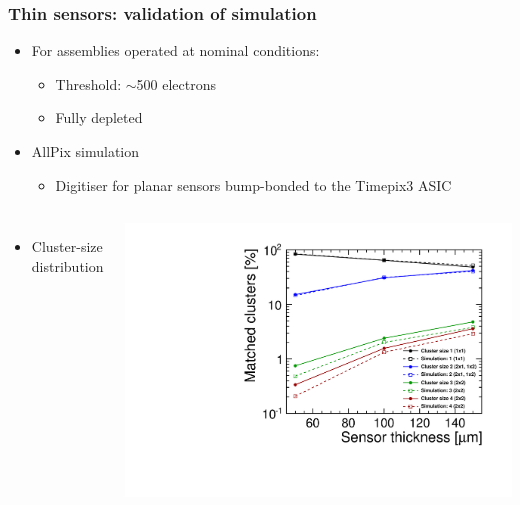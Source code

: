 \begin{frame}
\begin{columns}[t]
  \end{columns}
  
\end{frame}

\begin{frame}
  \frametitle{Thin sensors: validation of simulation}

  \begin{itemize}
  \item For assemblies operated at nominal conditions:
    \begin{itemize}
    \item Threshold: $\sim$500 electrons
    \item Fully depleted
    \end{itemize}
  \item AllPix simulation
    \begin{itemize}
    \item Digitiser for planar sensors bump-bonded to the Timepix3
      ASIC
    \end{itemize}
  \end{itemize}

  \begin{columns}
    \begin{itemize}
    \item Cluster-size distribution
    \end{itemize}
    \centering
    \includegraphics[width=\textwidth]{../figures/TestBeam/cluSize_vs_thickness.pdf}


\end{columns}
\end{frame}
